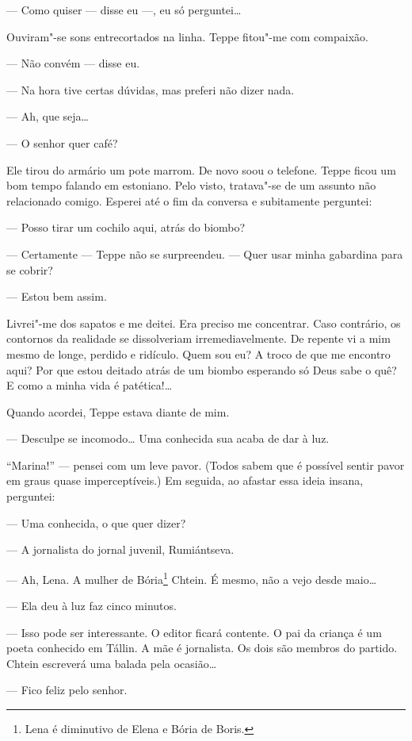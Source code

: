 --- Como quiser --- disse eu ---, eu só perguntei\ldots{}

Ouviram"-se sons entrecortados na linha. Teppe fitou"-me com compaixão.

--- Não convém --- disse eu.

--- Na hora tive certas dúvidas, mas preferi não dizer nada.

--- Ah, que seja\ldots{}

--- O senhor quer café?

Ele tirou do armário um pote marrom. De novo soou o telefone. Teppe
ficou um bom tempo falando em estoniano. Pelo visto, tratava"-se de um
assunto não relacionado comigo. Esperei até o fim da conversa e
subitamente perguntei:

--- Posso tirar um cochilo aqui, atrás do biombo?

--- Certamente --- Teppe não se surpreendeu. --- Quer usar minha
gabardina para se cobrir?

--- Estou bem assim.

Livrei"-me dos sapatos e me deitei. Era preciso me concentrar. Caso
contrário, os contornos da realidade se dissolveriam irremediavelmente.
De repente vi a mim mesmo de longe, perdido e ridículo. Quem sou eu? A
troco de que me encontro aqui? Por que estou deitado atrás de um biombo
esperando só Deus sabe o quê? E como a minha vida é patética!\ldots{}

Quando acordei, Teppe estava diante de mim.

--- Desculpe se incomodo\ldots{} Uma conhecida sua acaba de dar à luz.

``Marina!'' --- pensei com um leve pavor. (Todos sabem que é possível
sentir pavor em graus quase imperceptíveis.) Em seguida, ao afastar essa
ideia insana, perguntei:

--- Uma conhecida, o que quer dizer?

--- A jornalista do jornal juvenil, Rumiántseva.

--- Ah, Lena. A mulher de Bória\footnote{Lena é diminutivo de Elena e
  Bória de Boris.} Chtein. É mesmo, não a vejo desde maio\ldots{}

--- Ela deu à luz faz cinco minutos.

--- Isso pode ser interessante. O editor ficará contente. O pai da
criança é um poeta conhecido em Tállin. A mãe é jornalista. Os dois são
membros do partido. Chtein escreverá uma balada pela ocasião\ldots{}

--- Fico feliz pelo senhor.

